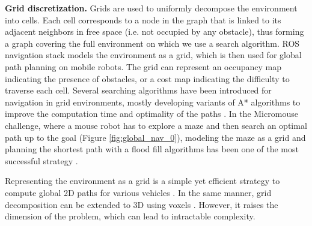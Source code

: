 \hfill 

\noindent\textbf{Grid discretization.}
Grids are used to uniformly decompose the environment into cells. 
Each cell corresponds to a node in the graph that is linked to its adjacent neighbors in free space (i.e. not occupied by any obstacle), thus forming a graph covering the full environment on which we use a search algorithm.
ROS navigation stack \cite{ROS_software} models the environment as a grid, which is then used for global path planning on mobile robots. The grid can represent an occupancy map indicating the presence of obstacles, or a cost map indicating the difficulty to traverse each cell.
Several searching algorithms have been introduced for navigation in grid environments, mostly developing variants of A* algorithms to improve the computation time and optimality of the paths \cite{Philippsen_2005, grid_duchon_2014}.
In the Micromouse challenge, where a mouse robot has to explore a maze and then search an optimal path up to the goal (Figure \ref{fig:global_nav_0}), modeling the maze as a grid and planning the shortest path with a flood fill algorithms has been one of the most successful strategy \cite{micromouse_mishra_2008, micromouse_Benavides2018}.

Representing the environment as a grid is a simple yet efficient strategy to compute global 2D paths for various vehicles \cite{car_grid_ferguson_2008, singh_boat_grid_2018, saeed_grid_2020}.
In the same manner, grid decomposition can be extended to 3D using voxels \cite{3d_field_voxel_carsten_2006, uav_aerial_perez_grau_voxel_2017}. However, it raises the dimension of the problem, which can lead to intractable complexity.\\


